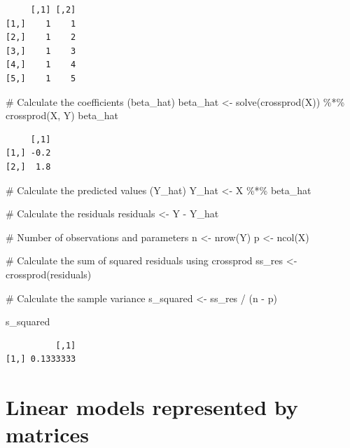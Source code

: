 \documentclass[
  letterpaper,
  DIV=11,
  numbers=noendperiod]{scrartcl}
\newenvironment{Shaded}{\begin{snugshade}}{\end{snugshade}}
\newcommand{\CommentTok}[1]{\textcolor[rgb]{0.37,0.37,0.37}{#1}}
\newcommand{\FunctionTok}[1]{\textcolor[rgb]{0.28,0.35,0.67}{#1}}
\newcommand{\NormalTok}[1]{\textcolor[rgb]{0.00,0.23,0.31}{#1}}
\newcommand{\OtherTok}[1]{\textcolor[rgb]{0.00,0.23,0.31}{#1}}
\newcommand{\SpecialCharTok}[1]{\textcolor[rgb]{0.37,0.37,0.37}{#1}}
\begin{document}
\begin{verbatim}
     [,1] [,2]
[1,]    1    1
[2,]    1    2
[3,]    1    3
[4,]    1    4
[5,]    1    5
\end{verbatim}

\begin{Shaded}
\begin{Highlighting}[]
\CommentTok{\# Calculate the coefficients (beta\_hat)}
\NormalTok{beta\_hat }\OtherTok{\textless{}{-}} \FunctionTok{solve}\NormalTok{(}\FunctionTok{crossprod}\NormalTok{(X)) }\SpecialCharTok{\%*\%} \FunctionTok{crossprod}\NormalTok{(X, Y)}
\NormalTok{beta\_hat}
\end{Highlighting}
\end{Shaded}

\begin{verbatim}
     [,1]
[1,] -0.2
[2,]  1.8
\end{verbatim}

\begin{Shaded}
\begin{Highlighting}[]
\CommentTok{\# Calculate the predicted values (Y\_hat)}
\NormalTok{Y\_hat }\OtherTok{\textless{}{-}}\NormalTok{ X }\SpecialCharTok{\%*\%}\NormalTok{ beta\_hat}

\CommentTok{\# Calculate the residuals}
\NormalTok{residuals }\OtherTok{\textless{}{-}}\NormalTok{ Y }\SpecialCharTok{{-}}\NormalTok{ Y\_hat}

\CommentTok{\# Number of observations and parameters}
\NormalTok{n }\OtherTok{\textless{}{-}} \FunctionTok{nrow}\NormalTok{(Y)}
\NormalTok{p }\OtherTok{\textless{}{-}} \FunctionTok{ncol}\NormalTok{(X)}

\CommentTok{\# Calculate the sum of squared residuals using crossprod}
\NormalTok{ss\_res }\OtherTok{\textless{}{-}} \FunctionTok{crossprod}\NormalTok{(residuals)}

\CommentTok{\# Calculate the sample variance}
\NormalTok{s\_squared }\OtherTok{\textless{}{-}}\NormalTok{ ss\_res }\SpecialCharTok{/}\NormalTok{ (n }\SpecialCharTok{{-}}\NormalTok{ p)}

\NormalTok{s\_squared}
\end{Highlighting}
\end{Shaded}

\begin{verbatim}
          [,1]
[1,] 0.1333333
\end{verbatim}

\section{Linear models represented by
matrices}\label{linear-models-represented-by-matrices}
\end{document}
